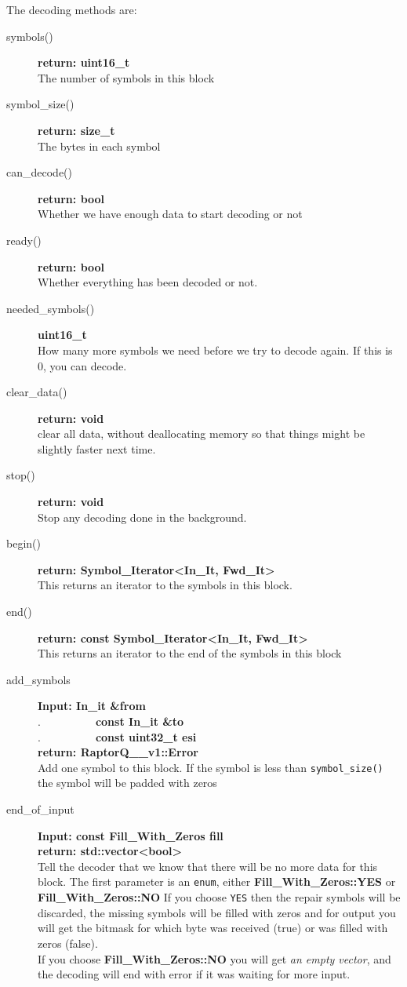 \documentclass[11pt,a4paper]{refart}
\begin{document}
The decoding methods are:

\begin{description}
\item[symbols()]\textbf{return: uint16\_t}\\
The number of symbols in this block
\item[symbol\_size()]\textbf{return: size\_t}\\
The bytes in each symbol
\item[can\_decode()]\textbf{return: bool}\\
Whether we have enough data to start decoding or not
\item[ready()]\textbf{return: bool}\\
Whether everything has been decoded or not.
\item[needed\_symbols()]\textbf{uint16\_t}\\
How many more symbols we need before we try to decode again. If this is 0, you can decode.
\item[clear\_data()]\textbf{return: void}\\
clear all data, without deallocating memory so that things might be slightly faster next time.
\item[stop()]\textbf{return: void}\\
Stop any decoding done in the background.

\item[begin()] \textbf{return: Symbol\_Iterator<In\_It, Fwd\_It>}\\
This returns an iterator to the symbols in this block.
\item[end()] \textbf{return: const Symbol\_Iterator<In\_It, Fwd\_It>}\\
This returns an iterator to the end of the symbols in this block

\item[add\_symbols] \textbf{Input: In\_it \&from}\\
.\ \ \ \ \ \ \ \ \ \ \textbf{const In\_it \&to}\\
.\ \ \ \ \ \ \ \ \ \ \textbf{const uint32\_t esi}\\
\textbf{return: RaptorQ\_\_v1::Error}\\
Add one symbol to this block. If the symbol is less than \texttt{symbol\_size()} the symbol will be padded with zeros
\item[end\_of\_input] \textbf{Input: const Fill\_With\_Zeros fill}\\
\textbf{return: std::vector<bool>}\\
Tell the decoder that we know that there will be no more data for this block.
The first parameter is an \texttt{enum}, either \textbf{Fill\_With\_Zeros::YES}  or \textbf{Fill\_With\_Zeros::NO}
If you choose \texttt{YES} then the repair symbols will be discarded, the missing symbols will be filled with zeros
and for output you will get the bitmask for which byte was received (true) or was filled with zeros (false).\\
If you choose \textbf{Fill\_With\_Zeros::NO} you will get \textit{an empty vector}, and the decoding will end with error if it was waiting for more input.



\end{description}
\end{document}
